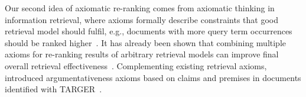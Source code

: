 Our second idea of axiomatic re-ranking comes from axiomatic thinking in information retrieval, where axioms formally describe constraints that good retrieval model should fulfil, e.g., documents with more query term occurrences should be ranked higher~\citet{FangTZ2004}. It has already been shown that combining multiple axioms for re-ranking results of arbitrary retrieval models can improve final overall retrieval effectiveness~\cite{HagenVGS2016}. Complementing existing retrieval axioms, \citet{BondarenkoHVSPB2018} introduced argumentativeness axioms based on claims and premises in documents identified with TARGER~\cite{ChernodubOHBHBP2019}.

